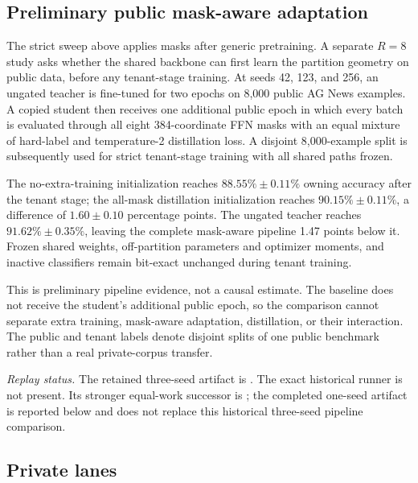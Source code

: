 \documentclass[11pt]{article}
\begin{document}
\subsection{Preliminary public mask-aware adaptation}

The strict sweep above applies masks after generic pretraining. A separate
$R=8$ study asks whether the shared backbone can first learn the partition
geometry on public data, before any tenant-stage training. At seeds 42, 123,
and 256, an ungated teacher is fine-tuned for two epochs on 8,000 public AG
News examples. A copied student then receives one additional public epoch in
which every batch is evaluated through all eight 384-coordinate FFN masks with
an equal mixture of hard-label and temperature-2 distillation loss. A disjoint
8,000-example split is subsequently used for strict tenant-stage training with
all shared paths frozen.

The no-extra-training initialization reaches $88.55\%\pm0.11\%$ owning
accuracy after the tenant stage; the all-mask distillation initialization
reaches $90.15\%\pm0.11\%$, a difference of $1.60\pm0.10$ percentage points.
The ungated teacher reaches $91.62\%\pm0.35\%$, leaving the complete
mask-aware pipeline 1.47 points below it. Frozen shared weights,
off-partition parameters and optimizer moments, and inactive classifiers
remain bit-exact unchanged during tenant training.

This is preliminary pipeline evidence, not a causal estimate. The baseline
does not receive the student's additional public epoch, so the comparison
cannot separate extra training, mask-aware adaptation, distillation, or their
interaction. The public and tenant labels denote disjoint splits of one public
benchmark rather than a real private-corpus transfer.

\begin{sloppypar}
\noindent\textit{Replay status.} The retained three-seed artifact is
.
The exact historical runner is not present. Its stronger equal-work successor
is ; the completed
one-seed artifact is reported below and does not replace this historical
three-seed pipeline comparison.
\end{sloppypar}

\subsection{Private lanes}
\end{document}
